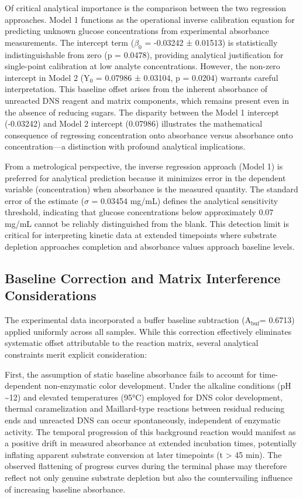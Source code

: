 \documentclass[
  12pt,
]{article}
\begin{document}
Of critical analytical importance is the comparison between the two
regression approaches. Model 1 functions as the operational inverse
calibration equation for predicting unknown glucose concentrations from
experimental absorbance measurements. The intercept term (\(\beta_0\) =
-0.03242 ± 0.01513) is statistically indistinguishable from zero (p =
0.0478), providing analytical justification for single-point calibration
at low analyte concentrations. However, the non-zero intercept in Model
2 (\(\text{Y}_0\) = 0.07986 ± 0.03104, p = 0.0204) warrants careful
interpretation. This baseline offset arises from the inherent absorbance
of unreacted DNS reagent and matrix components, which remains present
even in the absence of reducing sugars. The disparity between the Model
1 intercept (-0.03242) and Model 2 intercept (0.07986) illustrates the
mathematical consequence of regressing concentration onto absorbance
versus absorbance onto concentration---a distinction with profound
analytical implications.

From a metrological perspective, the inverse regression approach (Model
1) is preferred for analytical prediction because it minimizes error in
the dependent variable (concentration) when absorbance is the measured
quantity. The standard error of the estimate (\(\sigma\) = 0.03454
mg/mL) defines the analytical sensitivity threshold, indicating that
glucose concentrations below approximately 0.07 mg/mL cannot be reliably
distinguished from the blank. This detection limit is critical for
interpreting kinetic data at extended timepoints where substrate
depletion approaches completion and absorbance values approach baseline
levels.

\subsection{Baseline Correction and Matrix Interference
Considerations}\label{baseline-correction-and-matrix-interference-considerations}

The experimental data incorporated a buffer baseline subtraction
(\(\text{A}_\text{buf}\)= 0.6713) applied uniformly across all samples.
While this correction effectively eliminates systematic offset
attributable to the reaction matrix, several analytical constraints
merit explicit consideration:

First, the assumption of static baseline absorbance fails to account for
time-dependent non-enzymatic color development. Under the alkaline
conditions (pH \textasciitilde12) and elevated temperatures (95°C)
employed for DNS color development, thermal caramelization and
Maillard-type reactions between residual reducing ends and unreacted DNS
can occur spontaneously, independent of enzymatic activity. The temporal
progression of this background reaction would manifest as a positive
drift in measured absorbance at extended incubation times, potentially
inflating apparent substrate conversion at later timepoints (t
\textgreater{} 45 min). The observed flattening of progress curves
during the terminal phase may therefore reflect not only genuine
substrate depletion but also the countervailing influence of increasing
baseline absorbance.
\end{document}
